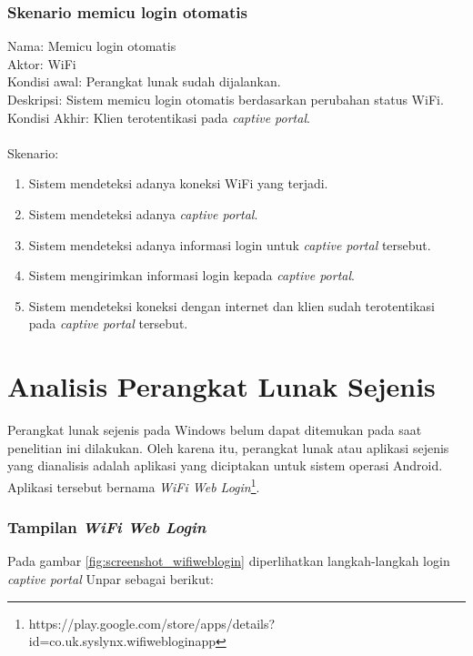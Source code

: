 \subsubsection{Skenario memicu login otomatis}
Nama: Memicu login otomatis\\
Aktor: WiFi\\
Kondisi awal: Perangkat lunak sudah dijalankan.\\
Deskripsi: Sistem memicu login otomatis berdasarkan perubahan status WiFi.\\
Kondisi Akhir: Klien terotentikasi pada \textit{captive portal}.\\\\
Skenario:
\begin{enumerate}
    \item{Sistem mendeteksi adanya koneksi WiFi yang terjadi.}
    \item{Sistem mendeteksi adanya \textit{captive portal}.}
    \item{Sistem mendeteksi adanya informasi login untuk \textit{captive portal} tersebut.}
    \item{Sistem mengirimkan informasi login kepada \textit{captive portal}.}
    \item{Sistem mendeteksi koneksi dengan internet dan klien sudah terotentikasi pada \textit{captive portal} tersebut.}
\end{enumerate}



\section{Analisis Perangkat Lunak Sejenis}
\label{sec:perangkat_lunak_sejenis}

Perangkat lunak sejenis pada Windows belum dapat ditemukan pada saat penelitian ini dilakukan. Oleh karena itu, perangkat lunak atau aplikasi sejenis yang dianalisis adalah aplikasi yang diciptakan untuk sistem operasi Android. Aplikasi tersebut bernama \textit{WiFi Web Login}\footnote{https://play.google.com/store/apps/details?id=co.uk.syslynx.wifiwebloginapp}.

\subsubsection{Tampilan \textit{WiFi Web Login}}
\label{subsubsec:tampilan_wifi_web_login}

Pada gambar \ref{fig:screenshot_wifiweblogin} diperlihatkan langkah-langkah login \textit{captive portal} Unpar sebagai berikut:

